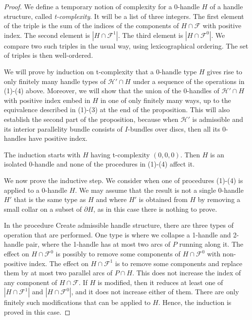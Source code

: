 \documentclass[oneside]{amsart}
\numberwithin{equation}{section}
\theoremstyle{plain}
\theoremstyle{definition}
\begin{document}
\begin{proof}
We define a temporary notion of complexity for a 0-handle $H$ of a handle structure, called \emph{t-complexity}. It will be a list of three integers. The first element of the triple is the sum of the indices of the components of $H \cap \mathcal{F}$ with positive index. The second element is $|H \cap \mathcal{F}^1|$. The third element is $|H \cap \mathcal{F}^0|$. We compare two such triples in the usual way, using lexicographical ordering. The set of triples is then well-ordered.

We will prove by induction on t-complexity that a 0-handle type $H$ gives rise to only finitely many handle types of $\mathcal{H}' \cap H$ under a sequence of the operations in (1)-(4) above. Moreover, we will show that the union of the 0-handles of $\mathcal{H}' \cap H$ with positive index embed in $H$ in one of only finitely many ways, up to the equivalence described in (1)-(3) at the end of the proposition. This will also establish the second part of the proposition, because when $\mathcal{H}'$ is admissible and its interior parallelity bundle consists of $I$-bundles over discs, then all its 0-handles have positive index.

The induction starts with $H$ having t-complexity $(0,0,0)$. Then $H$ is an isolated 0-handle and none of the procedures in (1)-(4) affect it.

We now prove the inductive step. We consider when one of procedures (1)-(4) is applied to a 0-handle $H$. We may assume that the result is not a single 0-handle $H'$ that is the same type as $H$ and where $H'$ is obtained from $H$ by removing a small collar on a subset of $\partial H$, as in this case there is nothing to prove.

In the procedure {\sc Create admissible handle structure}, there are three types of operation that are performed. One type is where we collapse a 1-handle and 2-handle pair, where the 1-handle has at most two arcs of $P$ running along it. The effect on $H \cap \mathcal{F}^0$ is possibly to remove some components of $H \cap \mathcal{F}^0$ with non-positive index. The effect on  $H \cap \mathcal{F}^1$ is to remove some components and replace them by at most two parallel arcs of $P \cap H$. This does not increase the index of any component of $H \cap \mathcal{F}$. If $H$ is modified, then it reduces at least one of $|H \cap \mathcal{F}^1|$ and $|H \cap \mathcal{F}^0|$, and it does not increase either of them. There are only finitely such modifications that can be applied to $H$. Hence, the induction is proved in this case.


\end{proof}
\end{document}
